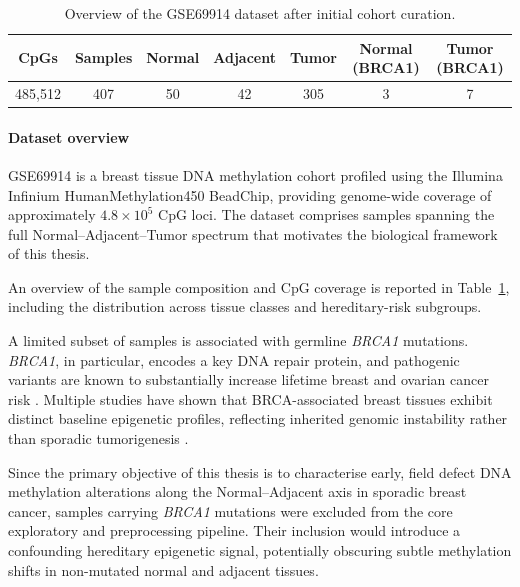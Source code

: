 \begin{table}[t]
\centering
\caption{Overview of the GSE69914 dataset after initial cohort curation.}
\label{tab:gse69914_overview}
\scriptsize
\begin{tabular}{c c c c c c c}
\toprule
\textbf{CpGs} &
\textbf{Samples} &
\textbf{Normal} &
\textbf{Adjacent} &
\textbf{Tumor} &
\textbf{Normal (BRCA1)} &
\textbf{Tumor (BRCA1)} \\
\midrule
485{,}512 &
407 &
50 &
42 &
305 &
3 &
7 \\
\bottomrule
\end{tabular}
\end{table}

\paragraph{Dataset overview}
\label{par:gse69914_overview}

GSE69914 is a breast tissue DNA methylation cohort profiled using the Illumina Infinium HumanMethylation450 BeadChip, providing genome-wide coverage of approximately $4.8\times10^5$ CpG loci. The dataset comprises samples spanning the full Normal--Adjacent--Tumor spectrum that motivates the biological framework of this thesis.

An overview of the sample composition and CpG coverage is reported in Table~\ref{tab:gse69914_overview}, including the distribution across tissue classes and hereditary-risk subgroups.

A limited subset of samples is associated with germline \textit{BRCA1} mutations. \textit{BRCA1}, in particular, encodes a key DNA repair protein, and pathogenic variants are known to substantially increase lifetime breast and ovarian cancer risk \cite{brca_factsheet}. Multiple studies have shown that BRCA-associated breast tissues exhibit distinct baseline epigenetic profiles, reflecting inherited genomic instability rather than sporadic tumorigenesis \cite{Bartlett2022,Suijkerbuijk2008}.

Since the primary objective of this thesis is to characterise early, field defect DNA methylation alterations along the Normal--Adjacent axis in sporadic breast cancer, samples carrying \textit{BRCA1} mutations were excluded from the core exploratory and preprocessing pipeline. Their inclusion would introduce a confounding hereditary epigenetic signal, potentially obscuring subtle methylation shifts in non-mutated normal and adjacent tissues.





